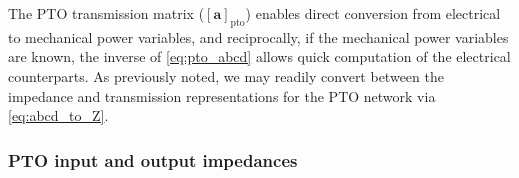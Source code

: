 \documentclass[5p,times]{elsarticle}
\begin{document}

%
The PTO transmission matrix ($\left[ \mathbf{a} \right]_{\textrm{pto}}$) enables direct conversion from electrical to mechanical power variables, and reciprocally, if the mechanical power variables are known, the inverse of \eqref{eq:pto_abcd} allows quick computation of the electrical counterparts.
As previously noted, we may readily convert between the impedance and transmission representations for the PTO network via \eqref{eq:abcd_to_Z}.


\subsubsection{PTO input and output impedances}\label{sec:pto_input_and_output_impedances}
\end{document}
